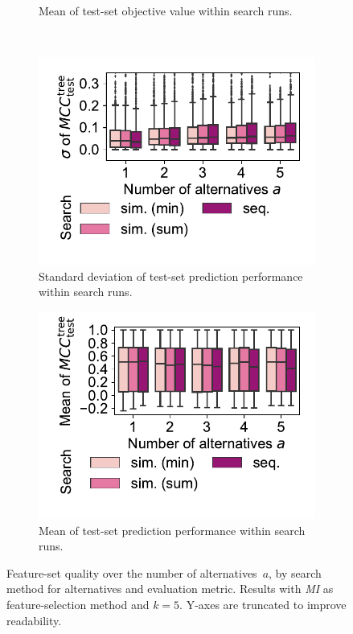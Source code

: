 \documentclass{article}
\theoremstyle{definition}
\begin{document}
\begin{figure}[p]
\begin{subfigure}[t]{0.48\textwidth}
		\caption{Mean of test-set objective value with\-in search runs.}
		\label{fig:afs:impact-search-mean-test-objective}
	\end{subfigure}
	\\ \vspace{\baselineskip}
	\begin{subfigure}[t]{0.48\textwidth}
		\centering
		\includegraphics[width=\textwidth, trim=15 25 15 5, clip]{plots/afs-impact-search-stddev-decision-tree-test-mcc.pdf}
		\caption{Standard deviation of test-set prediction performance within search runs.}
		\label{fig:afs:impact-search-stddev-decision-tree-test-mcc}
	\end{subfigure}
	\hfill
	\begin{subfigure}[t]{0.48\textwidth}
		\centering
		\includegraphics[width=\textwidth, trim=15 25 15 5, clip]{plots/afs-impact-search-mean-decision-tree-test-mcc.pdf}
		\caption{Mean of test-set prediction performance within search runs.}
		\label{fig:afs:impact-search-mean-decision-tree-test-mcc}
	\end{subfigure}
	\caption{
		Feature-set quality over the number of alternatives~$a$, by search method for alternatives and evaluation metric.
		Results with \emph{MI} as feature-selection method and $k=5$.
		Y-axes are truncated to improve readability.
	}
	\label{fig:afs:impact-search-quality}
\end{figure}
\end{document}
